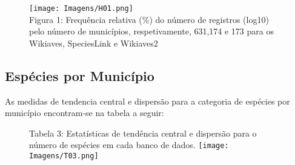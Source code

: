 \documentclass[12pt]{extarticle}
\newenvironment{resposta}{ \color{mygray}}{}
\begin{document}
\newpage

\begin{figure}[h!]
\centering
\texttt{[image: Imagens/H01.png]}
\\{\scriptsize Figura 1: Frequência relativa (\%) do número de registros (log10) pelo número de municípios, respetivamente, 631,174 e 173 para os Wikiaves, SpeciesLink e Wikiaves2  }
\end{figure}

\subsection{Espécies por Município}

\begin{resposta}
As medidas de tendencia central e dispersão para a categoria de espécies por município encontram-se na tabela a seguir: 
\end{resposta}


\begin{figure}[h!]
\centering
{\scriptsize Tabela 3: Estatísticas de tendência central e dispersão para o número de espécies em cada banco de dados.}
\texttt{[image: Imagens/T03.png]}
\end{figure}
\end{document}
